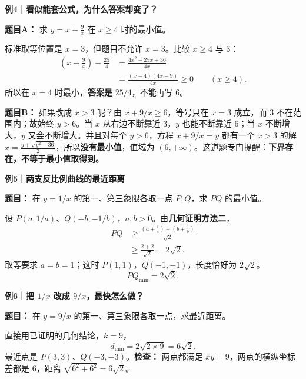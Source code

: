 \clearpage
\begin{examplebox}
\textbf{例4｜看似能套公式，为什么答案却变了？}



\textbf{题目A：} 求 $y=x+\frac9x$ 在 $x\ge4$ 时的最小值。

标准取等位置是 $x=3$，但题目不允许 $x=3$。比较 $x\ge4$ 与 $3$：
\[
\begin{aligned}
\left(x+\frac9x\right)-\frac{25}{4}
&=\frac{4x^2-25x+36}{4x}\\
&=\frac{(x-4)(4x-9)}{4x}\ge0
\qquad(x\ge4).
\end{aligned}
\]
所以在 $x=4$ 时最小，\textbf{答案是} $\boxed{25/4}$，不能再写 $6$。

\textbf{题目B：} 如果改成 $x>3$ 呢？由 $x+9/x\ge6$，等号只在 $x=3$ 成立，而 $3$ 不在范围内；故始终 $y>6$。当 $x$ 从右边不断靠近 $3$，$y$ 也能不断靠近 $6$；当 $x$ 不断增大，$y$ 又会不断增大。并且对每个 $y>6$，方程 $x+9/x=y$ 都有一个 $x>3$ 的解 $x=\frac{y+\sqrt{y^2-36}}2$，所以\textbf{没有最小值}，值域为 $\boxed{(6,+\infty)}$。这道题专门提醒：\textbf{下界存在，不等于最小值取得到。}

\medskip
\end{examplebox}
\clearpage
\begin{examplebox}
\textbf{例5｜两支反比例曲线的最近距离}



\textbf{题目：} 在 $y=1/x$ 的第一、第三象限各取一点 $P,Q$，求 $PQ$ 的最小值。

设 $P(a,1/a)$、$Q(-b,-1/b)$，$a,b>0$。由\textbf{几何证明方法二}，
\[
\begin{aligned}
PQ&\ge\frac{\left(a+\frac1a\right)+\left(b+\frac1b\right)}{\sqrt2}\\
&\ge\frac{2+2}{\sqrt2}=2\sqrt2.
\end{aligned}
\]
取等要求 $a=b=1$；这时 $P(1,1)$，$Q(-1,-1)$，长度恰好为 $2\sqrt2$。
\[
\boxed{PQ_{\min}=2\sqrt2}.
\]

\medskip
\end{examplebox}
\clearpage
\begin{examplebox}
\textbf{例6｜把 $1/x$ 改成 $9/x$，最快怎么做？}



\textbf{题目：} 在 $y=9/x$ 的第一、第三象限各取一点，求最近距离。

直接用已证明的几何结论，$k=9$，
\[
\boxed{d_{\min}=2\sqrt{2\times9}=6\sqrt2}.
\]
最近点是 $P(3,3)$、$Q(-3,-3)$。\textbf{检查：} 两点都满足 $xy=9$，两点的横纵坐标差都是 $6$，距离 $\sqrt{6^2+6^2}=6\sqrt2$。

\medskip
\end{examplebox}
